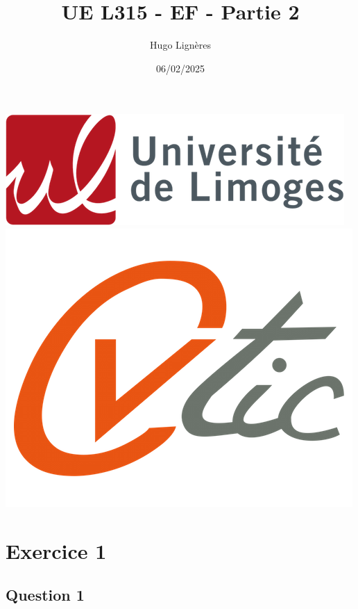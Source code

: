 \documentclass[12pt,a4paper]{article}
\title{UE L315 - EF - Partie 2}
\author{Hugo Lignères}
\date{06/02/2025}
\begin{document}
\maketitle

\hrulefill
\vspace{6cm}
\begin{center}
	\includegraphics[scale=.4]{../images/univ.png}
		\\
		\vspace{2cm}
	\includegraphics[scale=.25]{../images/cvtic.png}
\end{center}


\newpage

\section*{Exercice 1}

	\subsection*{Question 1}
	
\end{document}

